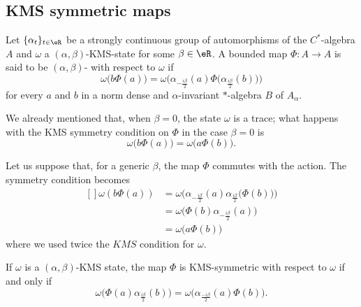 \subsection{KMS symmetric maps}

\begin{definition}
	Let $\{ \alpha_t \}_{t\in\eR}$ be a strongly continuous group of automorphisms of the $C^*$-algebra $A$ and $\omega$ a $(\alpha,\beta)$-KMS-state for some $\beta\in\eR$. A bounded map $\Phi\colon A\to A$ is said to be $(\alpha,\beta)$- with respect to $\omega$ if
	\begin{equation}		\label{EqKMSCondPhi}
		\omega\big( b\Phi(a) \big)=\omega\Big( \alpha_{-\frac{ i\beta }{2}}(a)\Phi\big( \alpha_{\frac{ i\beta }{2}}(b) \big) \Big)
	\end{equation}
	for every $a$ and $b$ in a norm dense and $\alpha$-invariant $*$-algebra $B$ of $A_{\alpha}$.
\end{definition}
We already mentioned that, when $\beta=0$, the state $\omega$ is a trace; what happens with the KMS symmetry condition on $\Phi$ in the case $\beta=0$ is
\begin{equation}
	\omega\big( b\Phi(a) \big)=\omega\big( a\Phi(b) \big).
\end{equation}

Let us suppose that, for a generic $\beta$, the map $\Phi$ commutes with the action. The symmetry condition becomes
\begin{equation}
	\begin{aligned}[]
		\omega(b\Phi(a))&=\omega\Big( \alpha_{-\frac{ i\beta }{2}}(a)\alpha_{\frac{ i\beta }{2}}\big( \Phi(b) \big) \Big)\\
		&=\omega\big( \Phi(b)\alpha_{-\frac{ i\beta }{2}}(a) \big)\\
		&=\omega\big( a\Phi(b) \big)
	\end{aligned}
\end{equation}
where we used twice the $KMS$ condition for $\omega$.

\begin{lemma}
	If $\omega$ is a $(\alpha,\beta)$-KMS state, the map $\Phi$ is KMS-symmetric with respect to $\omega$ if and only if
	\begin{equation}
		\omega\big( \Phi(a)\alpha_{\frac{ i\beta }{2}}(b) \big)=\omega\big( \alpha_{\frac{-i\beta }{2}}(a)\Phi(b) \big).
	\end{equation}
\end{lemma}

